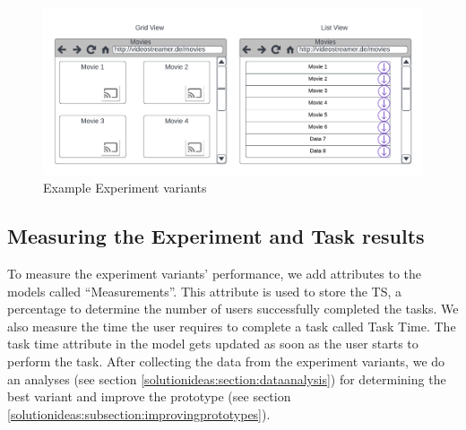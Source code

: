 \begin{figure}[ht]
	\centering
  \includegraphics[width=1.0\textwidth]{images/solution-ideas/Experimentvariants.png}
	\caption{Example Experiment variants}
	\label{solutionideas:fig:experimentingvariants}
\end{figure}

\subsection{Measuring the Experiment and Task results}
\label{solutionideas:subsection:measurements}
To measure the experiment variants' performance, we add attributes to the models called ``Measurements''.
This attribute is used to store the TS, a percentage to determine the number of users successfully completed the tasks.
We also measure the time the user requires to complete a task called Task Time.
The task time attribute in the model gets updated as soon as the user starts to perform the task.
After collecting the data from the experiment variants, we do an analyses (see section \ref{solutionideas:section:dataanalysis}) for determining the best variant and improve the prototype (see section \ref{solutionideas:subsection:improvingprototypes}).

